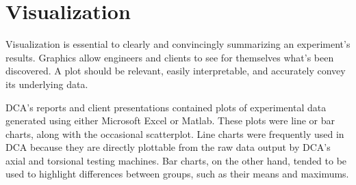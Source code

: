 \documentclass[11pt,a4paper,article]{memoir} %
\begin{document}
\section{Visualization}
\label{sec:dca_vis}
Visualization is essential to clearly and convincingly summarizing an experiment's results. Graphics allow engineers and clients to see for themselves what's been discovered. A plot should be relevant, easily interpretable, and accurately convey its underlying data.
\par
DCA's reports and client presentations contained plots of experimental data generated using either Microsoft Excel or Matlab. These plots were line or bar charts, along with the occasional scatterplot. Line charts were frequently used in DCA because they are directly plottable from the raw data output by DCA's axial and torsional testing machines. Bar charts, on the other hand, tended to be used to highlight differences between groups, such as their means and maximums.
\end{document}
